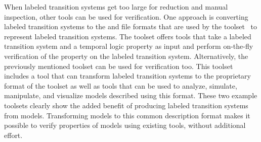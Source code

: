 When labeled transition systems get too large for reduction and manual inspection, other tools can be used for verification.
One approach is converting labeled transition systems to the \BCG and \AUT file formats that are used by the \CADP toolset~\cite{DBLP:conf/tacas/GaravelLMS11} to represent labeled transition systems.
The \CADP toolset offers tools that take a labeled transition system and a temporal logic property as input and perform on-the-fly verification of the property on the labeled transition system. Alternatively, the previously mentioned \mCRLTwo toolset can be used for verification too.
This toolset includes a tool that can transform labeled transition systems to the proprietary format of the toolset as well as tools that can be used to analyze, simulate, manipulate, and visualize models described using this format.
These two example toolsets clearly show the added benefit of producing labeled transition systems from \SLCO models.
Transforming models to this common description format makes it possible to verify properties of models using existing tools, without additional effort. 